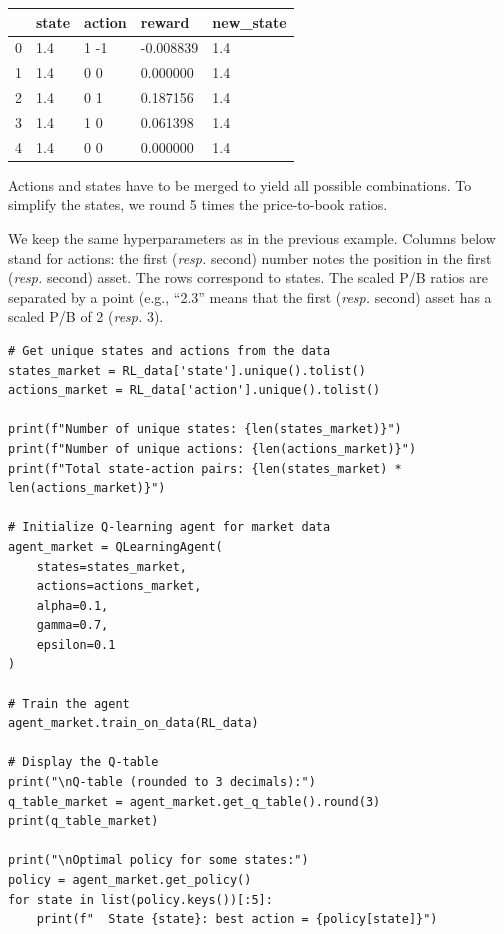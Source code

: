 \bigskip\noindent
\begin{tabular}{p{}p{}p{}p{}p{}}
\toprule
 & state & action & reward & new\_state \\
\hline
0 & 1.4 & 1 -1 & -0.008839 & 1.4 \\
\hline
1 & 1.4 & 0 0 & 0.000000 & 1.4 \\
\hline
2 & 1.4 & 0 1 & 0.187156 & 1.4 \\
\hline
3 & 1.4 & 1 0 & 0.061398 & 1.4 \\
\hline
4 & 1.4 & 0 0 & 0.000000 & 1.4 \\
\hline
\bottomrule
\end{tabular}

\bigskip

Actions and states have to be merged to yield all possible combinations. To simplify the states, we round 5 times the price-to-book ratios.

We keep the same hyperparameters as in the previous example. Columns below stand for actions: the first (\textit{resp.} second) number notes the position in the first (\textit{resp.} second) asset. The rows correspond to states. The scaled P/B ratios are separated by a point (e.g., ``2.3'' means that the first (\textit{resp.} second) asset has a scaled P/B of 2 (\textit{resp.} 3).

\begin{verbatim}
# Get unique states and actions from the data
states_market = RL_data['state'].unique().tolist()
actions_market = RL_data['action'].unique().tolist()

print(f"Number of unique states: {len(states_market)}")
print(f"Number of unique actions: {len(actions_market)}")
print(f"Total state-action pairs: {len(states_market) * len(actions_market)}")

# Initialize Q-learning agent for market data
agent_market = QLearningAgent(
    states=states_market,
    actions=actions_market,
    alpha=0.1,
    gamma=0.7,
    epsilon=0.1
)

# Train the agent
agent_market.train_on_data(RL_data)

# Display the Q-table
print("\nQ-table (rounded to 3 decimals):")
q_table_market = agent_market.get_q_table().round(3)
print(q_table_market)

print("\nOptimal policy for some states:")
policy = agent_market.get_policy()
for state in list(policy.keys())[:5]:
    print(f"  State {state}: best action = {policy[state]}")
\end{verbatim}


